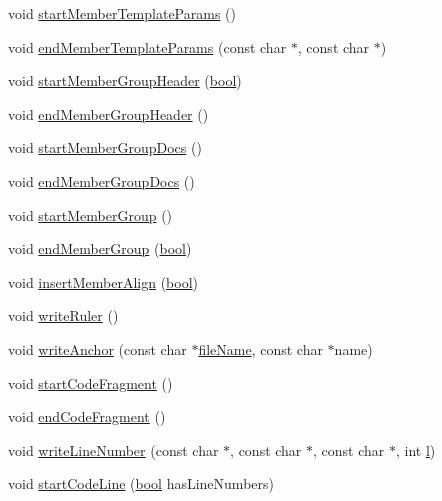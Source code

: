 \begin{DoxyCompactItemize}
\item 
void \hyperlink{class_latex_generator_ab5f3a94b36ee1eb5086432b5dd6d2f26}{start\+Member\+Template\+Params} ()
\item 
void \hyperlink{class_latex_generator_a3911278e93403187061551fb65a14910}{end\+Member\+Template\+Params} (const char $\ast$, const char $\ast$)
\item 
void \hyperlink{class_latex_generator_a82e907a0ee2aaaf3ef300d8b2314bacc}{start\+Member\+Group\+Header} (\hyperlink{qglobal_8h_a1062901a7428fdd9c7f180f5e01ea056}{bool})
\item 
void \hyperlink{class_latex_generator_ac4339024ccc0da904106eaf6df9514a5}{end\+Member\+Group\+Header} ()
\item 
void \hyperlink{class_latex_generator_a0c1c92164bf40215e01c128cd6d4dc62}{start\+Member\+Group\+Docs} ()
\item 
void \hyperlink{class_latex_generator_a75f69fc27fd975f0203456390c498490}{end\+Member\+Group\+Docs} ()
\item 
void \hyperlink{class_latex_generator_af2b5da0352920bfb5d889ff92b751b70}{start\+Member\+Group} ()
\item 
void \hyperlink{class_latex_generator_a7e4061ce114f8c12c4137582541771af}{end\+Member\+Group} (\hyperlink{qglobal_8h_a1062901a7428fdd9c7f180f5e01ea056}{bool})
\item 
void \hyperlink{class_latex_generator_ab4c418164024ead6645f1c8526887862}{insert\+Member\+Align} (\hyperlink{qglobal_8h_a1062901a7428fdd9c7f180f5e01ea056}{bool})
\item 
void \hyperlink{class_latex_generator_a3b87ba9aa190c6337db947023df1c0cc}{write\+Ruler} ()
\item 
void \hyperlink{class_latex_generator_a158d49cddc6c34aea663fe0726616332}{write\+Anchor} (const char $\ast$\hyperlink{class_output_generator_a9bb808101dbeae7732bb0fa66cad9176}{file\+Name}, const char $\ast$name)
\item 
void \hyperlink{class_latex_generator_a4fc23629424d5f2bb82f87d2d0311361}{start\+Code\+Fragment} ()
\item 
void \hyperlink{class_latex_generator_a761292f353178bad45e21ca40cbe6115}{end\+Code\+Fragment} ()
\item 
void \hyperlink{class_latex_generator_a02bd7806ea67c323b902b2311811eb2b}{write\+Line\+Number} (const char $\ast$, const char $\ast$, const char $\ast$, int \hyperlink{060__command__switch_8tcl_aff56f84b49947b84b2a304f51cf8e678}{l})
\item 
void \hyperlink{class_latex_generator_a9bfa7242e97eca8f1d795245bb98fa37}{start\+Code\+Line} (\hyperlink{qglobal_8h_a1062901a7428fdd9c7f180f5e01ea056}{bool} has\+Line\+Numbers)

\end{DoxyCompactItemize}

